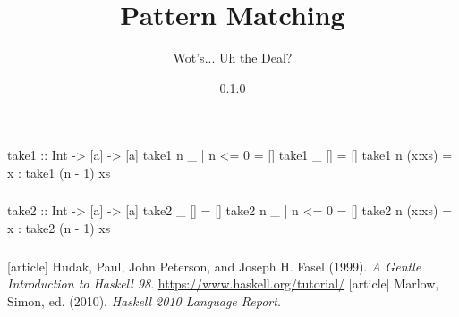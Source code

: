 \documentclass{beamer}
\title{Pattern Matching}
\subtitle{Wot's... Uh the Deal?}
\author{}
\institute{Stack Builders}
\date{0.1.0}
\begin{document}
\frame{\titlepage}

\begin{frame}[fragile]
  \frametitle{}

  \begin{code}
take1 :: Int -> [a] -> [a]
take1 n _      | n <= 0 = []
take1 _ []              = []
take1 n (x:xs)          = x : take1 (n - 1) xs
  \end{code}
\end{frame}

\begin{frame}[fragile]
  \frametitle{}

  \begin{code}
take2 :: Int -> [a] -> [a]
take2 _ []              = []
take2 n _      | n <= 0 = []
take2 n (x:xs)          = x : take2 (n - 1) xs
  \end{code}
\end{frame}

\begin{frame}
  \frametitle{}

  \begin{thebibliography}{}
  [article]
    Hudak, Paul, John Peterson, and Joseph H. Fasel (1999).
    \newblock \emph{A Gentle Introduction to Haskell 98}.
    \newblock \url{https://www.haskell.org/tutorial/}
  [article]
    Marlow, Simon, ed. (2010).
    \newblock \emph{Haskell 2010 Language Report}.
  \end{thebibliography}
\end{frame}
\end{document}
